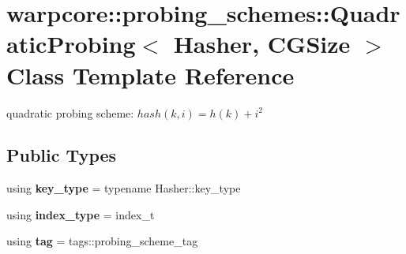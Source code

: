 \hypertarget{classwarpcore_1_1probing__schemes_1_1QuadraticProbing}{}\section{warpcore\+:\+:probing\+\_\+schemes\+:\+:Quadratic\+Probing$<$ Hasher, C\+G\+Size $>$ Class Template Reference}
\label{classwarpcore_1_1probing__schemes_1_1QuadraticProbing}


quadratic probing scheme\+: $hash(k,i) = h(k)+i^2$  


\subsection*{Public Types}
\begin{DoxyCompactItemize}
\item 
\mbox{\label{classwarpcore_1_1probing__schemes_1_1QuadraticProbing_ad66a4c99e11be13be22a742aa9f502c9}} 
using {\bfseries key\+\_\+type} = typename Hasher\+::key\+\_\+type
\item 
\mbox{\label{classwarpcore_1_1probing__schemes_1_1QuadraticProbing_ad8b8070e3d75f5480261d0beafbfb80d}} 
using {\bfseries index\+\_\+type} = index\+\_\+t
\item 
\mbox{\label{classwarpcore_1_1probing__schemes_1_1QuadraticProbing_ac2f8b26473f87a3f6a024b06f67cfe5e}} 
using {\bfseries tag} = tags\+::probing\+\_\+scheme\+\_\+tag
\end{DoxyCompactItemize}
